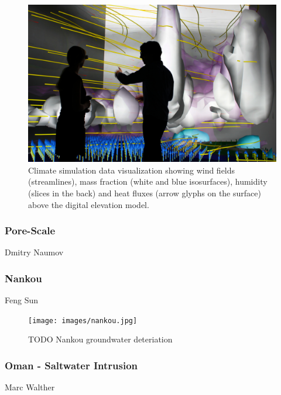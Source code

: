 \begin{figure}
  \includegraphics[width=\linewidth]{images/wind.jpg}
  \caption{Climate simulation data visualization showing wind fields (streamlines), mass fraction (white and blue isosurfaces), humidity (slices in the back) and heat fluxes (arrow glyphs on the surface) above the digital elevation model.}
\label{fig:wind}
\end{figure}

\subsubsection{Pore-Scale}
\label{pore-scale}

Dmitry Naumov

\subsubsection{Nankou}
\label{nankou}

Feng Sun \cite{sun:ees}

\begin{figure}
  \texttt{[image: images/nankou.jpg]}
\caption{TODO Nankou groundwater deteriation}
\label{fig:nankou}
\end{figure}

\subsubsection{Oman - Saltwater Intrusion}
\label{oman---saltwater-intrusion}

Marc Walther

